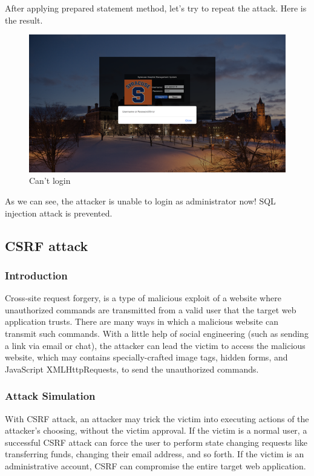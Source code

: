 After applying prepared statement method, let’s try to repeat the attack. Here is the result.
\begin{figure}[H]
    \centering
    \includegraphics[width=\textwidth]{sp/sp4.png}
    \caption{Can't login}
    \label{fig:s4}
\end{figure}
 
As we can see, the attacker is unable to login as administrator now! SQL injection attack is prevented.

\subsection{CSRF attack}
\subsubsection{Introduction}
Cross-site request forgery, is a type of malicious exploit of a website where unauthorized commands are transmitted from a valid user that the target web application trusts. There are many ways in which a malicious website can transmit such commands. With a little help of social engineering (such as sending a link via email or chat), the attacker can lead the victim to access the malicious website, which may contains specially-crafted image tags, hidden forms, and JavaScript XMLHttpRequests, to send the unauthorized commands.
\subsubsection{Attack Simulation}
With CSRF attack, an attacker may trick the victim into executing actions of the attacker's choosing, without the victim approval. If the victim is a normal user, a successful CSRF attack can force the user to perform state changing requests like transferring funds, changing their email address, and so forth. If the victim is an administrative account, CSRF can compromise the entire target web application.

